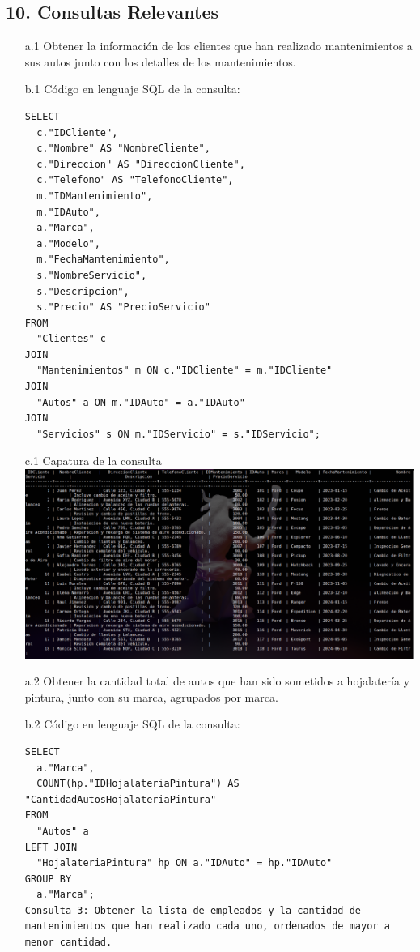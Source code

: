 \documentclass[12pt]{article}
\begin{document}
    \subsection*{10. Consultas Relevantes}
    \begin{itemize}
        \item[a.1] Obtener la información de los clientes que han realizado mantenimientos a sus autos junto con los detalles de los mantenimientos.
        \item[b.1] Código en lenguaje SQL de la consulta:
        \begin{lstlisting}
SELECT
  c."IDCliente",
  c."Nombre" AS "NombreCliente",
  c."Direccion" AS "DireccionCliente",
  c."Telefono" AS "TelefonoCliente",
  m."IDMantenimiento",
  m."IDAuto",
  a."Marca",
  a."Modelo",
  m."FechaMantenimiento",
  s."NombreServicio",
  s."Descripcion",
  s."Precio" AS "PrecioServicio"
FROM
  "Clientes" c
JOIN
  "Mantenimientos" m ON c."IDCliente" = m."IDCliente"
JOIN
  "Autos" a ON m."IDAuto" = a."IDAuto"
JOIN
  "Servicios" s ON m."IDServicio" = s."IDServicio";
    \end{lstlisting}
    \item[c.1] Capatura de la consulta
    \center\includegraphics[width=1.0\textwidth]{K.png}
    \item[a.2] Obtener la cantidad total de autos que han sido sometidos a hojalatería y pintura, junto con su marca, agrupados por marca.
    \item[b.2] Código en lenguaje SQL de la consulta:
    \begin{lstlisting}
SELECT
  a."Marca",
  COUNT(hp."IDHojalateriaPintura") AS "CantidadAutosHojalateriaPintura"
FROM
  "Autos" a
LEFT JOIN
  "HojalateriaPintura" hp ON a."IDAuto" = hp."IDAuto"
GROUP BY
  a."Marca";
Consulta 3: Obtener la lista de empleados y la cantidad de mantenimientos que han realizado cada uno, ordenados de mayor a menor cantidad.
    \end{lstlisting}

\end{itemize}
\end{document}
